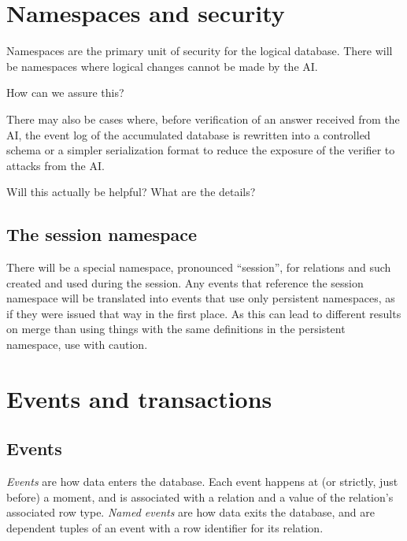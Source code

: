 \documentclass{article}
\begin{document}
\section{Namespaces and security}

Namespaces are the primary unit of security for the logical database.  There will be namespaces where logical changes cannot be made by the AI.

\begin{question}
	How can we assure this?
\end{question}

There may also be cases where, before verification of an answer received from the AI, the event log of the accumulated database is rewritten into a controlled schema or a simpler serialization format to reduce the exposure of the verifier to attacks from the AI.

\begin{question}
	Will this actually be helpful?  What are the details?
\end{question}

\subsection{The session namespace}
\label{session-namespace}

There will be a special namespace, pronounced ``session'', for relations and such created and used during the session.  Any events that reference the session namespace will be translated into events that use only persistent namespaces, as if they were issued that way in the first place.  As this can lead to different results on merge than using things with the same definitions in the persistent namespace, use with caution.

\section{Events and transactions}

\subsection{Events}

\emph{Events} are how data enters the database.  Each event happens at (or strictly, just before) a moment, and is associated with a relation and a value of the relation's associated row type.  \emph{Named events} are how data exits the database, and are dependent tuples of an event with a row identifier for its relation.
\end{document}

